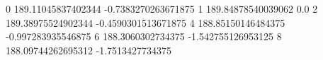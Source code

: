 0 189.11045837402344 -0.7383270263671875
1 189.84878540039062 0.0
2 189.38975524902344 -0.4590301513671875
4 188.85150146484375 -0.997283935546875
6 188.3060302734375 -1.542755126953125
8 188.09744262695312 -1.7513427734375
